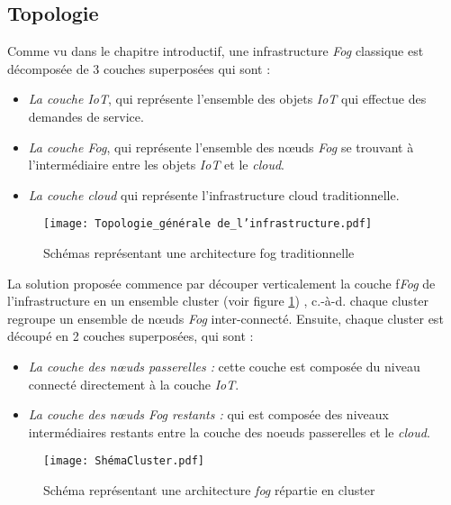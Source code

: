 \subsection{Topologie}
Comme vu dans le chapitre introductif, une infrastructure \emph{Fog} classique est décomposée de 3 couches superposées qui sont :
\begin{itemize}
    \item \emph{La couche IoT}, qui représente l’ensemble des objets \emph{IoT} qui effectue des demandes de service.
    \item \emph{La couche Fog}, qui représente l’ensemble des nœuds \emph{Fog} se trouvant à l’intermédiaire entre les objets \emph{IoT} et le \emph{cloud}.
    \item \emph{La couche cloud} qui représente l’infrastructure cloud traditionnelle.
\end{itemize}
\begin{figure}[H]
    \centering
    \texttt{[image: Topologie\_générale de\_l'infrastructure.pdf]}
    \caption{Schémas représentant une architecture fog traditionnelle}
    \label{fig:Topologie_generale_de_linfrastructure}
\end{figure}
La solution proposée commence par découper verticalement la couche f\emph{Fog} de l'infrastructure en un ensemble cluster (voir figure \ref{fig:Topologie_generale_de_linfrastructure}) , c.-à-d. chaque cluster regroupe un ensemble de nœuds \emph{Fog} inter-connecté. Ensuite, chaque cluster est découpé en 2 couches superposées, qui sont :
\begin{itemize}
    \item \emph{La couche des nœuds passerelles :}  cette couche est composée du niveau connecté directement à la couche \emph{IoT}.
    \item \emph{La couche des nœuds Fog restants :} qui est composée des niveaux intermédiaires restants entre la couche des noeuds passerelles et le \emph{cloud}.
\end{itemize}
\begin{figure}[H]
    \centering
    \texttt{[image: ShémaCluster.pdf]}
    \caption{Schéma représentant une architecture \emph{fog} répartie en cluster}
    \label{fig:Infrastructure_fog_repartie_en_cluster}
\end{figure}
